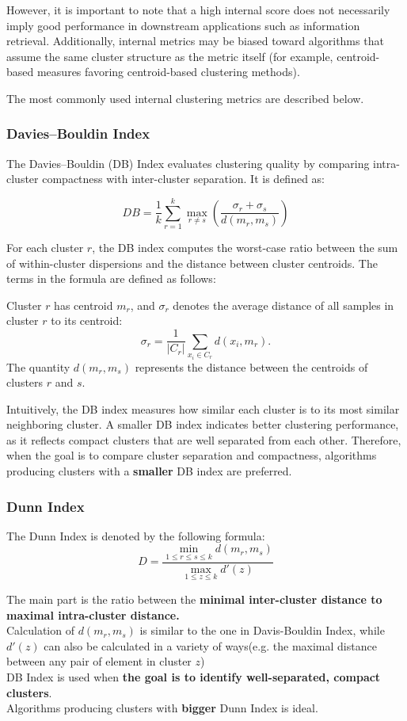 \documentclass{article}
\begin{document}
However, it is important to note that a high internal score does not necessarily imply good performance in downstream applications such as information retrieval. Additionally, internal metrics may be biased toward algorithms that assume the same cluster structure as the metric itself (for example, centroid-based measures favoring centroid-based clustering methods).

The most commonly used internal clustering metrics are described below.

\subsubsection{Davies–Bouldin Index}

The Davies–Bouldin (DB) Index evaluates clustering quality by comparing intra-cluster compactness with inter-cluster separation. It is defined as:

\[
DB = \frac{1}{k}\sum_{r=1}^{k}\max_{r \neq s}\left(\frac{\sigma_r + \sigma_s}{d(m_r,m_s)}\right)
\]

For each cluster $r$, the DB index computes the worst-case ratio between the sum of within-cluster dispersions and the distance between cluster centroids. The terms in the formula are defined as follows:

Cluster $r$ has centroid $m_r$, and $\sigma_r$ denotes the average distance of all samples in cluster $r$ to its centroid:
\[
\sigma_r = \frac{1}{|C_r|} \sum_{x_i \in C_r} d(x_i, m_r).
\]
The quantity $d(m_r,m_s)$ represents the distance between the centroids of clusters $r$ and $s$.

Intuitively, the DB index measures how similar each cluster is to its most similar neighboring cluster. A smaller DB index indicates better clustering performance, as it reflects compact clusters that are well separated from each other. Therefore, when the goal is to compare cluster separation and compactness, algorithms producing clusters with a \textbf{smaller} DB index are preferred.

\subsubsection{Dunn Index}
The Dunn Index is denoted by the following formula:\[
D = \frac{\displaystyle \min_{1\leq r\leq s\leq k}d(m_r,m_s)}{\displaystyle \max_{1\leq z\leq k}d'(z)}
\]

The main part is the ratio between the \textbf{minimal inter-cluster distance to maximal intra-cluster distance.}\\
Calculation of $d(m_r,m_s)$ is similar to the one in Davis-Bouldin Index, while $d'(z)$ can also be calculated in a variety of ways(e.g. the maximal distance between any pair of element in cluster $z$)\\
DB Index is used when \textbf{the goal is to identify well-separated, compact clusters}.\\
Algorithms producing clusters with \textbf{bigger} Dunn Index is ideal.
\end{document}
